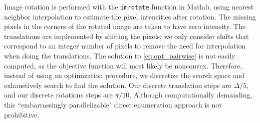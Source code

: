 \documentclass{pnastwo}
\begin{document}
\begin{article}
\begin{materials}
%
Image rotation is performed with the \texttt{imrotate} function in Matlab, using nearest neighbor interpolation to estimate the pixel intensities after rotation.
%
The missing pixels in the corners of the rotated image are taken to have zero intensity.
%
The translations are implemented by shifting the pixels;
we only consider shifts that correspond to an integer number of pixels to remove the need for interpolation when doing the translations.
%
The solution to \eqref{eq:opt_pairwise} is not easily computed, as the objective function will most likely be nonconvex.
%
Therefore, instead of using an optimization procedure, we discretize the search space and exhaustively search to find the solution.
%
Our discrete translation steps are $\Delta/5$, and our discrete rotations steps are $\pi/10$. 
%
%
%
Although computationally demanding, this ``embarrassingly parallelizable" direct enumeration approach is not prohibitive.
%
%
%

%
%


\end{materials}
\end{article}
\end{document}
